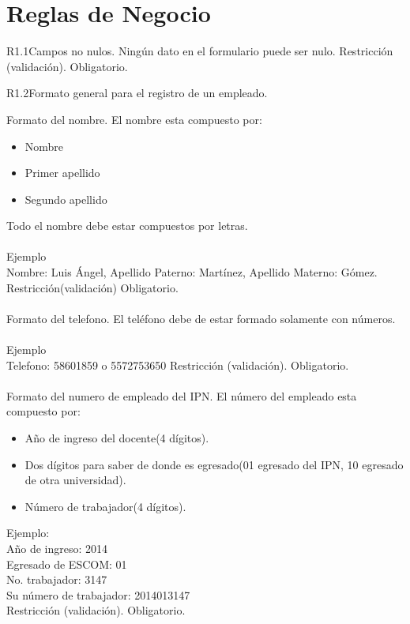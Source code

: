 
\section{Reglas de Negocio}

\begin{BussinesRule}{R1.1}{Campos no nulos.} 
	\BRitem[Descripción:] Ningún dato en el formulario puede ser nulo.
	\BRitem[Tipo:] Restricción (validación).
	\BRitem[Nivel:] Obligatorio.
\end{BussinesRule}


\begin{BussinesRule}{R1.2}{Formato general para el registro de un empleado.} 

	\BRitem[Nombre:] Formato del nombre.
	\BRitem[Descripción:] El nombre esta compuesto por:
		\begin{itemize} 
			\item Nombre
			\item Primer apellido
			\item Segundo apellido 
		\end{itemize}
		Todo el nombre debe estar compuestos por letras.\\\\
	Ejemplo \\
	Nombre: Luis Ángel, Apellido Paterno: Martínez, Apellido Materno: Gómez.
	\BRitem[Tipo:] Restricción(validación)
	\BRitem[Nivel:] Obligatorio.\\\\

	\BRitem[Telefono:] Formato del telefono.
	\BRitem[Descripción:] El teléfono debe de estar formado solamente con números.\\\\
	Ejemplo \\
	Telefono: 58601859 o 5572753650
	\BRitem[Tipo:] Restricción (validación).
	\BRitem[Nivel:] Obligatorio.\\\\

	 Formato del numero de empleado del IPN.
	\BRitem[Descripción:] El número del empleado esta compuesto por:
		\begin{itemize} 
			\item Año de ingreso del docente(4 dígitos).
			\item Dos dígitos para saber de donde es egresado(01 egresado del IPN, 10 egresado de otra universidad).
			\item Número de trabajador(4 dígitos).
		\end{itemize}
	Ejemplo:\\
		Año de ingreso: 2014\\
		Egresado de ESCOM: 01\\
		No. trabajador: 3147\\
		Su número de trabajador: 2014013147\\
	\BRitem[Tipo:] Restricción (validación).
	\BRitem[Nivel:] Obligatorio.\\\\


\end{BussinesRule}
